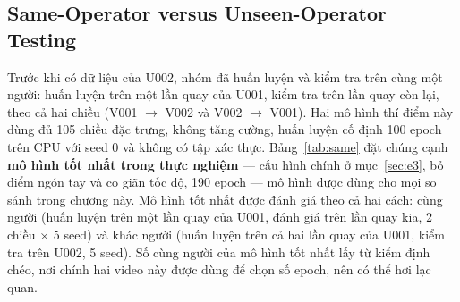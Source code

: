 \subsection{Same-Operator versus Unseen-Operator Testing}\label{sec:same}

Trước khi có dữ liệu của U002, nhóm đã huấn luyện và kiểm tra trên cùng một người: huấn luyện trên một lần quay của U001, kiểm tra trên lần quay còn lại, theo cả hai chiều (V001 $\rightarrow$ V002 và V002 $\rightarrow$ V001). Hai mô hình thí điểm này dùng đủ 105 chiều đặc trưng, không tăng cường, huấn luyện cố định 100 epoch trên CPU với seed 0 và không có tập xác thực. Bảng~\ref{tab:same} đặt chúng cạnh \textbf{mô hình tốt nhất trong thực nghiệm} — cấu hình chính ở mục~\ref{sec:e3}, bỏ điểm ngón tay và co giãn tốc độ, 190 epoch — mô hình được dùng cho mọi so sánh trong chương này. Mô hình tốt nhất được đánh giá theo cả hai cách: cùng người (huấn luyện trên một lần quay của U001, đánh giá trên lần quay kia, 2 chiều $\times$ 5 seed) và khác người (huấn luyện trên cả hai lần quay của U001, kiểm tra trên U002, 5 seed). Số cùng người của mô hình tốt nhất lấy từ kiểm định chéo, nơi chính hai video này được dùng để chọn số epoch, nên có thể hơi lạc quan.

\begin{table}[H]
\centering
\caption{Kiểm tra trên cùng người và trên người mới: mô hình thí điểm và mô hình tốt nhất}\label{tab:same}
\scriptsize
\setlength{\tabcolsep}{3pt}\renewcommand{\arraystretch}{1.25}
\end{table}

